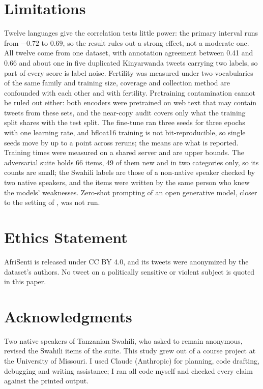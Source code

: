 \documentclass[11pt]{article}
\begin{document}
\section*{Limitations}
Twelve languages give the correlation tests little power: the primary interval runs from $-0.72$ to $0.69$, so the result rules out a strong effect, not a moderate one. All twelve come from one dataset, with annotation agreement between 0.41 and 0.66 and about one in five duplicated Kinyarwanda tweets carrying two labels, so part of every score is label noise. Fertility was measured under two vocabularies of the same family and training size, coverage and collection method are confounded with each other and with fertility. Pretraining contamination cannot be ruled out either: both encoders were pretrained on web text that may contain tweets from these sets, and the near-copy audit covers only what the training split shares with the test split. The fine-tune ran three seeds for three epochs with one learning rate, and bfloat16 training is not bit-reproducible, so single seeds move by up to a point across reruns; the means are what is reported. Training times were measured on a shared server and are upper bounds. The adversarial suite holds 66 items, 49 of them new and in two categories only, so its counts are small; the Swahili labels are those of a non-native speaker checked by two native speakers, and the items were written by the same person who knew the models' weaknesses. Zero-shot prompting of an open generative model, closer to the setting of \citet{lundin2026tokentax}, was not run.

\section*{Ethics Statement}
AfriSenti is released under CC BY 4.0, and its tweets were anonymized by the dataset's authors. No tweet on a politically sensitive or violent subject is quoted in this paper.

\section*{Acknowledgments}
Two native speakers of Tanzanian Swahili, who asked to remain anonymous, revised the Swahili items of the suite. This study grew out of a course project at the University of Missouri. I used Claude (Anthropic) for planning, code drafting, debugging and writing assistance; I ran all code myself and checked every claim against the printed output.


\end{document}
